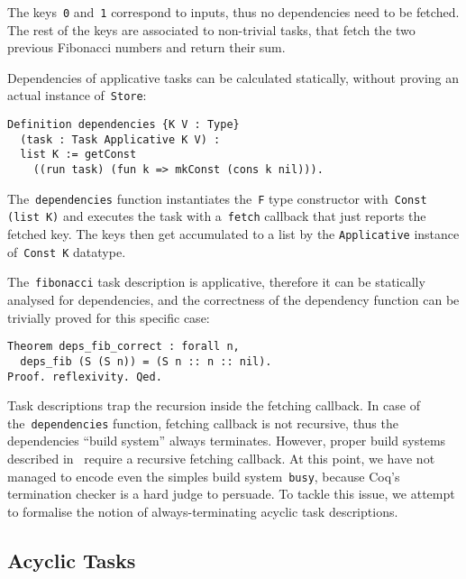 \documentclass[sigplan,review]{acmart}\settopmatter{printfolios=true,printccs=false,printacmref=false}
\newcommand{\hs}{\texttt}
\newcommand{\coq}{\texttt}
\begin{document}
The keys~\coq{0} and~\coq{1} correspond to inputs, thus no dependencies need to
be fetched. The rest of the keys are associated to non-trivial tasks, that fetch
the two previous Fibonacci numbers and return their sum.

Dependencies of applicative tasks can be calculated statically, without proving
an actual instance of~\hs{Store}:

\vspace{-1mm}
\begin{verbatim}
Definition dependencies {K V : Type}
  (task : Task Applicative K V) :
  list K := getConst
    ((run task) (fun k => mkConst (cons k nil))).
\end{verbatim}
\vspace{-1mm}

The~\coq{dependencies} function instantiates the~\hs{F} type constructor
with~\hs{Const (list K)} and executes the task with a~\hs{fetch} callback that
just reports the fetched key. The keys then get accumulated to a list by the
\hs{Applicative} instance of~\hs{Const K} datatype.

The~\coq{fibonacci} task description is applicative, therefore it can be
statically analysed for dependencies, and the correctness of the dependency
function can be trivially proved for this specific case:

\vspace{-1mm}
\begin{verbatim}
Theorem deps_fib_correct : forall n,
  deps_fib (S (S n)) = (S n :: n :: nil).
Proof. reflexivity. Qed.
\end{verbatim}
\vspace{-1mm}

Task descriptions trap the recursion inside the fetching callback. In case of
the~\coq{dependencies} function, fetching callback is not recursive, thus the
dependencies ``build system'' always terminates. However, proper build systems
described in~\cite{Mokhov2018icfp} require a recursive fetching callback.
At this point, we have not managed to encode even the simples build
system~\hs{busy}, because Coq's termination checker is a hard judge to persuade.
To tackle this issue, we attempt to formalise the notion of always-terminating
acyclic task descriptions.

\vspace{-3mm}
\subsection{Acyclic Tasks}
\end{document}
